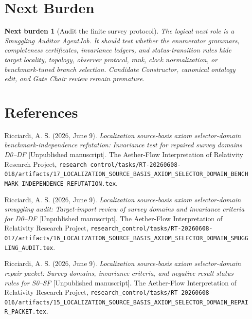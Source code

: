 \documentclass[11pt]{article}
\newtheorem{nextburden}{Next burden}
\begin{document}
\section{Next Burden}

\begin{nextburden}[Audit the finite survey protocol]
The logical next role is a Smuggling Auditor AgentJob. It should test whether
the enumerator grammars, completeness certificates, invariance ledgers, and
status-transition rules hide target locality, topology, observer protocol,
rank, clock normalization, or benchmark-tuned branch selection. Candidate
Constructor, canonical ontology edit, and Gate Chair review remain
premature.
\end{nextburden}

\section*{References}

Ricciardi, A. S. (2026, June 9). \emph{Localization source-basis axiom
selector-domain benchmark-independence refutation: Invariance test for
repaired survey domains D0--DF} [Unpublished manuscript]. The Aether-Flow
Interpretation of Relativity Research Project,
\texttt{research\_control/tasks/RT-20260608-018/artifacts/17\_LOCALIZATION\_SOURCE\_BASIS\_AXIOM\_SELECTOR\_DOMAIN\_BENCHMARK\_INDEPENDENCE\_REFUTATION.tex}.

Ricciardi, A. S. (2026, June 9). \emph{Localization source-basis axiom
selector-domain smuggling audit: Target-import review of survey domains and
invariance criteria for D0--DF} [Unpublished manuscript]. The Aether-Flow
Interpretation of Relativity Research Project,
\texttt{research\_control/tasks/RT-20260608-017/artifacts/16\_LOCALIZATION\_SOURCE\_BASIS\_AXIOM\_SELECTOR\_DOMAIN\_SMUGGLING\_AUDIT.tex}.

Ricciardi, A. S. (2026, June 9). \emph{Localization source-basis axiom
selector-domain repair packet: Survey domains, invariance criteria, and
negative-result status rules for S0--SF} [Unpublished manuscript]. The
Aether-Flow Interpretation of Relativity Research Project,
\texttt{research\_control/tasks/RT-20260608-016/artifacts/15\_LOCALIZATION\_SOURCE\_BASIS\_AXIOM\_SELECTOR\_DOMAIN\_REPAIR\_PACKET.tex}.
\end{document}
